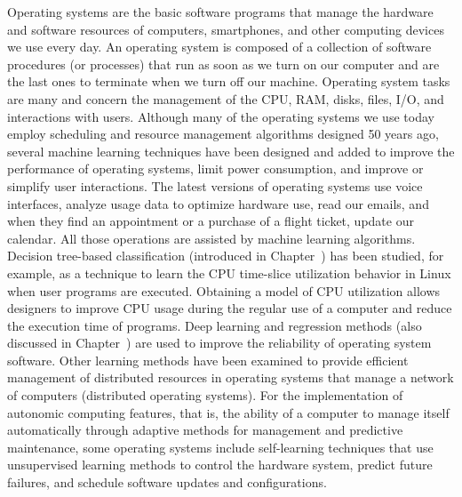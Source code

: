 Operating systems are the basic software programs that manage the hardware and software resources of computers, smartphones, and other computing devices we use every day. An operating system is composed of a collection of software procedures (or processes) that run as soon as we turn on our computer and are the last ones to terminate when we turn off our machine. Operating system tasks are many and concern the management of the CPU, RAM, disks, files, I/O, and interactions with users. Although many of the operating systems we use today employ scheduling and resource management algorithms designed 50 years ago, several machine learning techniques have been designed and added to improve the performance of operating systems, limit power consumption, and improve or simplify user interactions. The latest versions of operating systems use voice interfaces, analyze usage data to optimize hardware use, read our emails, and when they find an appointment or a purchase of a flight ticket, update our calendar. All those operations are assisted by machine learning algorithms. Decision tree-based classification (introduced in Chapter~) has been studied, for example, as a technique to learn the CPU time-slice utilization behavior in Linux when user programs are executed. Obtaining a model of CPU utilization allows designers to improve CPU usage during the regular use of a computer and reduce the execution time of programs. Deep learning and regression methods (also discussed in Chapter~) are used to improve the reliability of operating system software. Other learning methods have been examined to provide efficient management of distributed resources in operating systems that manage a network of computers (distributed operating systems). For the implementation of autonomic computing features, that is, the ability of a computer to manage itself automatically through adaptive methods for management and predictive maintenance, some operating systems include self-learning techniques that use unsupervised learning methods to control the hardware system, predict future failures, and schedule software updates and configurations.

